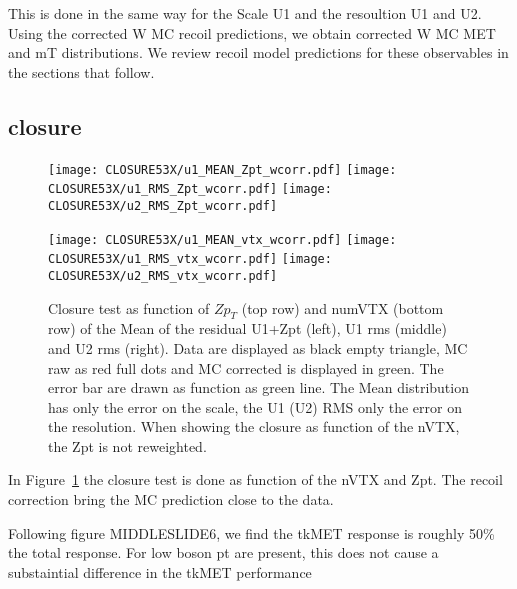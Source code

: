 \documentclass[41pt,a4paper,oneside]{report}
\begin{document}
This is done in the same way for the Scale U1 and the resoultion U1 and U2.
Using the corrected W MC recoil predictions, we obtain corrected W MC MET and mT distributions.
We review recoil model predictions for these observables in the sections that follow. 


\subsection{closure}

\begin{figure}[h!]
  \begin{center}
    \texttt{[image: CLOSURE53X/u1\_MEAN\_Zpt\_wcorr.pdf]}
    \texttt{[image: CLOSURE53X/u1\_RMS\_Zpt\_wcorr.pdf]}
    \texttt{[image: CLOSURE53X/u2\_RMS\_Zpt\_wcorr.pdf]}

    \texttt{[image: CLOSURE53X/u1\_MEAN\_vtx\_wcorr.pdf]}
    \texttt{[image: CLOSURE53X/u1\_RMS\_vtx\_wcorr.pdf]}
    \texttt{[image: CLOSURE53X/u2\_RMS\_vtx\_wcorr.pdf]}
    \caption{ 
      Closure test as function of $Zp_{T}$ (top row) and numVTX (bottom row) of the Mean of the residual U1+Zpt (left), U1 rms (middle) and U2 rms (right). Data are displayed as black empty triangle, MC raw as red full dots and MC corrected is displayed in green.
      The error bar are drawn as function as green line. The Mean distribution has only the error on the scale, the U1 (U2) RMS only the error on the resolution. When showing the closure as function of the nVTX, the Zpt is not reweighted.
{\color{magenta}{Need to split the control and target sample.}}
    }
    \label{fig:ClosureApplication}
  \end{center}
\end{figure}

In Figure~\ref{fig:ClosureApplication} the closure test is done as function of the nVTX and Zpt.
The recoil correction bring the MC prediction close to the data.

{\color{magenta}{HERE add the plots the UPrallal/PtZ and RMS Uparall/PtZ}}

Following figure MIDDLESLIDE6, we find the tkMET response is roughly 50\% the total
response. For low boson pt are present, this does not cause a substaintial
difference in the tkMET performance 
\end{document}
